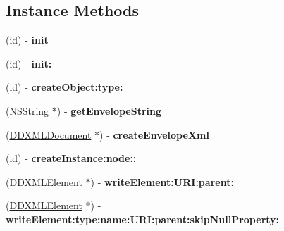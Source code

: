 \subsection*{Instance Methods}
\begin{DoxyCompactItemize}
\item 
\hypertarget{interface_request_result_handler_ac19791356a80368d2ac8f1c6e4aa21f1}{}(id) -\/ {\bfseries init}\label{interface_request_result_handler_ac19791356a80368d2ac8f1c6e4aa21f1}

\item 
\hypertarget{interface_request_result_handler_a26bdd60e42cb1fbc2855282ea9039f2a}{}(id) -\/ {\bfseries init\+:}\label{interface_request_result_handler_a26bdd60e42cb1fbc2855282ea9039f2a}

\item 
\hypertarget{interface_request_result_handler_a083bb1b05737263d26347a89c1c3c8fe}{}(id) -\/ {\bfseries create\+Object\+:type\+:}\label{interface_request_result_handler_a083bb1b05737263d26347a89c1c3c8fe}

\item 
\hypertarget{interface_request_result_handler_a470f791d202b35a7a01ff7cd78597e6d}{}(N\+S\+String $\ast$) -\/ {\bfseries get\+Envelope\+String}\label{interface_request_result_handler_a470f791d202b35a7a01ff7cd78597e6d}

\item 
\hypertarget{interface_request_result_handler_a4227dd3e92932fc0c5f15aea3a5ee64d}{}(\hyperlink{interface_d_d_x_m_l_document}{D\+D\+X\+M\+L\+Document} $\ast$) -\/ {\bfseries create\+Envelope\+Xml}\label{interface_request_result_handler_a4227dd3e92932fc0c5f15aea3a5ee64d}

\item 
\hypertarget{interface_request_result_handler_af4b2101f6e322c66aafbeb66ae7b7631}{}(id) -\/ {\bfseries create\+Instance\+:node\+::}\label{interface_request_result_handler_af4b2101f6e322c66aafbeb66ae7b7631}

\item 
\hypertarget{interface_request_result_handler_a2f058e4ef912b5385c3f318de3656ab6}{}(\hyperlink{interface_d_d_x_m_l_element}{D\+D\+X\+M\+L\+Element} $\ast$) -\/ {\bfseries write\+Element\+:\+U\+R\+I\+:parent\+:}\label{interface_request_result_handler_a2f058e4ef912b5385c3f318de3656ab6}

\item 
\hypertarget{interface_request_result_handler_aec60a6258aef86bd9a96b12b89cdcac9}{}(\hyperlink{interface_d_d_x_m_l_element}{D\+D\+X\+M\+L\+Element} $\ast$) -\/ {\bfseries write\+Element\+:type\+:name\+:\+U\+R\+I\+:parent\+:skip\+Null\+Property\+:}\label{interface_request_result_handler_aec60a6258aef86bd9a96b12b89cdcac9}


\end{DoxyCompactItemize}

